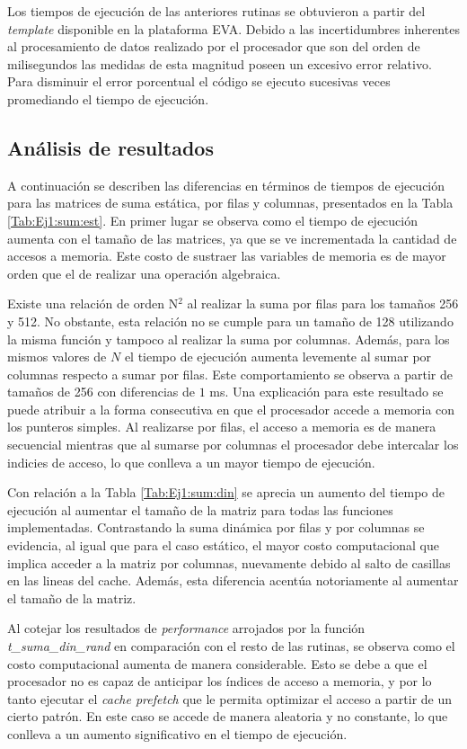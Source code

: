 \documentclass[11pt]{article}
\begin{document}
Los tiempos de ejecución de las anteriores rutinas se obtuvieron a partir del \emph{template} disponible en la plataforma EVA. Debido a las incertidumbres inherentes al procesamiento de datos realizado por el procesador que son del orden de milisegundos las medidas de esta magnitud poseen un excesivo error relativo. Para disminuir el error porcentual el código se ejecuto sucesivas veces promediando el tiempo de ejecución. 

\subsection*{Análisis de resultados}

A continuación se describen las diferencias en términos de tiempos de ejecución para las matrices de suma estática, por filas y columnas, presentados en la Tabla \ref{Tab:Ej1:sum:est}. En primer lugar se observa como el tiempo de ejecución aumenta con el tamaño de las matrices, ya que se ve incrementada la cantidad de accesos a memoria. Este costo de sustraer las variables de memoria es de mayor orden que el de realizar una operación algebraica. 

Existe una relación de orden N$^2$ al realizar la suma por filas para los tamaños 256 y 512. No obstante, esta relación no se cumple para un tamaño de 128 utilizando la misma función y tampoco al realizar la suma por columnas. Además, para los mismos valores de $N$ el tiempo de ejecución aumenta levemente al sumar por columnas respecto a sumar por filas. Este comportamiento se observa a partir de tamaños de 256 con diferencias de $1$ ms. Una explicación para este resultado se puede atribuir a la forma consecutiva en que el procesador accede a memoria con los punteros simples. Al realizarse por filas, el acceso a memoria es de manera secuencial mientras que al sumarse por columnas el procesador debe intercalar los indicies de acceso, lo que conlleva a un mayor tiempo de ejecución.

Con relación a la Tabla \ref{Tab:Ej1:sum:din} se aprecia un aumento del tiempo de ejecución al aumentar el tamaño de la matriz para todas las funciones implementadas. Contrastando la suma dinámica por filas y por columnas se evidencia, al igual que para el caso estático, el mayor costo computacional que implica acceder a la matriz por columnas, nuevamente debido al salto de casillas en las lineas del cache. Además, esta diferencia acentúa notoriamente al aumentar el tamaño de la matriz. 

Al cotejar los resultados de \emph{performance} arrojados por la función \emph{t\_suma\_din\_rand} en comparación con el resto de las rutinas, se observa como el costo computacional aumenta de manera considerable. Esto se debe a que el procesador no es capaz de anticipar los índices de acceso a memoria, y por lo tanto ejecutar el \emph{cache prefetch} que le permita optimizar el acceso a partir de un cierto patrón. En este caso se accede de manera aleatoria y no constante, lo que conlleva a un aumento significativo en el tiempo de ejecución. 
\end{document}
